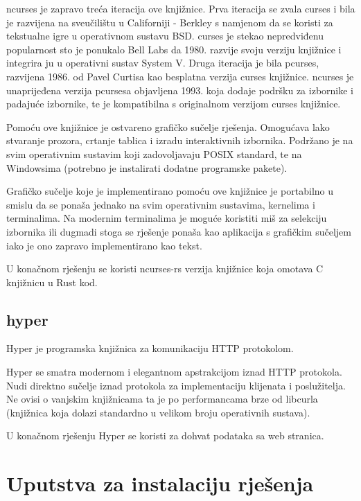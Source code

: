 \documentclass[times, utf8, zavrsni]{fer}
\begin{document}
ncurses je zapravo treća iteracija ove knjižnice. Prva iteracija se zvala
curses i bila je razvijena na sveučilištu u Californiji - Berkley s namjenom
da se koristi za tekstualne igre u operativnom sustavu BSD. curses je stekao
nepredviđenu popularnost sto je ponukalo Bell Labs da 1980. razvije svoju
verziju knjižnice i integrira ju u operativni sustav System V. Druga
iteracija je bila pcurses, razvijena 1986. od Pavel Curtisa kao besplatna
verzija curses knjižnice. ncurses je unaprijeđena verzija pcursesa objavljena
1993. koja dodaje podršku za izbornike i padajuće izbornike, te je kompatibilna
s originalnom verzijom curses knjižnice.

Pomoću ove knjižnice je ostvareno grafičko sučelje rješenja. Omogućava lako
stvaranje prozora, crtanje tablica i izradu interaktivnih izbornika. Podržano
je na svim operativnim sustavim koji zadovoljavaju POSIX standard, te na
Windowsima (potrebno je instalirati dodatne programske pakete).

Grafičko sučelje koje je implementirano pomoću ove knjižnice je portabilno u
smislu da se ponaša jednako na svim operativnim sustavima, kernelima i
terminalima. Na modernim terminalima je moguće koristiti miš za selekciju
izbornika ili dugmadi stoga se rješenje ponaša kao aplikacija s grafičkim
sučeljem iako je ono zapravo implementirano kao tekst.

U konačnom rješenju se koristi ncurses-rs \cite{ncurses_rs_repository} verzija
knjižnice koja omotava C knjižnicu u Rust kod.

\subsection{hyper}

Hyper \cite{hyper_repository} je programska knjižnica za komunikaciju HTTP
protokolom.

Hyper se smatra modernom i elegantnom apstrakcijom iznad HTTP protokola.
Nudi direktno sučelje iznad protokola za implementaciju klijenata i
poslužitelja.
Ne ovisi o vanjskim knjižnicama ta je po performancama brze od libcurla
(knjižnica koja dolazi standardno u velikom broju operativnih sustava).

U konačnom rješenju Hyper se koristi za dohvat podataka sa web stranica.

\section{Uputstva za instalaciju rješenja}
\end{document}
